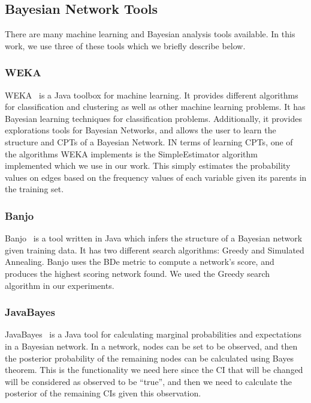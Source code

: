 \documentclass[10pt,twocolumn,letterpaper]{article}
\begin{document}
\subsection{Bayesian Network Tools}

There are many machine learning and Bayesian analysis tools available. In this work, we use three of these tools which we briefly describe
below.

\subsubsection{WEKA}

WEKA~\cite{hall2009weka} is a Java toolbox for machine learning. It provides different algorithms for classification and clustering as well as other machine
learning problems. It has Bayesian learning techniques for classification problems. Additionally, it provides explorations tools for Bayesian
Networks, and allows the user to learn the structure and CPTs of a Bayesian Network. IN terms of learning CPTs, one of the algorithms WEKA implements is
the SimpleEstimator algorithm~\cite{witten2005data} implemented which we use in our work. This simply estimates the probability values on edges based on
the frequency values of each variable given its parents in the training set.

\subsubsection{Banjo}
Banjo~\cite{banjotool} is a tool written in Java which infers the structure of a Bayesian network given training data. It has two different search algorithms:
Greedy and Simulated Annealing. Banjo uses the BDe metric to compute a network's score, and produces the highest scoring network found. We used the Greedy
search algorithm in our experiments.

\subsubsection{JavaBayes}

JavaBayes~\cite{javabayestool} is a Java tool for calculating marginal probabilities and expectations in a Bayesian network. In a network, nodes can be set to
be observed, and then
the posterior probability of the remaining nodes can be calculated using Bayes theorem. This is the functionality we need here since the CI that will be
changed will be considered as observed to be ``true'', and then we need to calculate the posterior of the remaining CIs given this observation.
\end{document}
